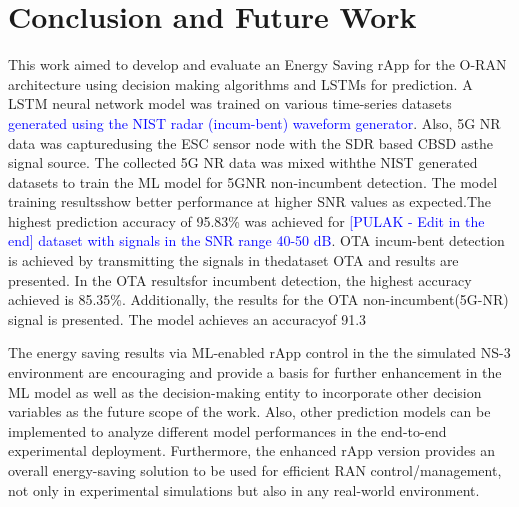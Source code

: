 \section{Conclusion and Future Work}
This work aimed to develop and evaluate an Energy Saving rApp for the O-RAN architecture using decision making algorithms and LSTMs for prediction. A LSTM neural network model was trained on various time-series datasets \textcolor{blue}{generated using the NIST radar (incum-bent) waveform generator}. Also, 5G NR data was capturedusing the ESC sensor node with the SDR based CBSD asthe signal source. The collected 5G NR data was mixed withthe NIST generated datasets to train the ML model for 5GNR non-incumbent detection. The model training resultsshow better performance at higher SNR values as expected.The highest prediction accuracy of 95.83\% was achieved for \textcolor{blue}{[PULAK - Edit in the end] dataset with signals in the SNR range 40-50 dB}. OTA incum-bent detection is achieved by transmitting the signals in thedataset OTA and results are presented. In the OTA resultsfor incumbent detection, the highest accuracy achieved is 85.35\%. Additionally, the results for the OTA non-incumbent(5G-NR) signal is presented. The model achieves an accuracyof 91.3%

The energy saving results via ML-enabled rApp control in the the simulated NS-3 environment are encouraging and provide a basis for further enhancement in the ML model as well as the decision-making entity to incorporate other decision variables as the future scope of the work. Also, other prediction models can be implemented to analyze different model performances in the end-to-end experimental deployment. Furthermore, the enhanced rApp version provides an overall energy-saving solution to be used for efficient RAN control/management, not only in experimental simulations but also in any real-world environment.

